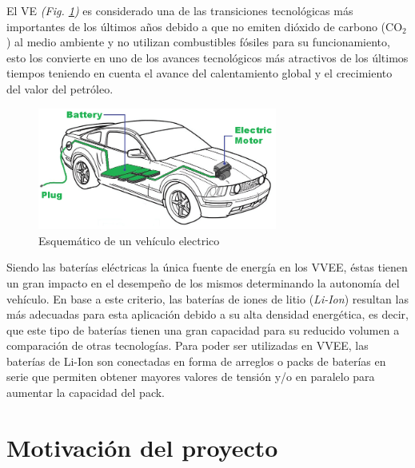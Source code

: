 \documentclass[10pt, a4paper]{report}
\begin{document}
\noindent El \acrfull{VE} \emph{(Fig. \ref{EV})} es considerado 
una de las transiciones tecnológicas más importantes de los últimos años 
debido a que no emiten dióxido de carbono ($\mathrm{CO_2}$) al medio 
ambiente y no utilizan combustibles fósiles para su funcionamiento, esto 
los convierte en uno de los avances tecnológicos más atractivos de los 
últimos tiempos teniendo en cuenta el avance del calentamiento global y el 
crecimiento del valor del petróleo.

\begin{figure}[h!]
    \begin{center}
	\includegraphics[width=0.7\textwidth]{EV.png}
	\caption{Esquem\'atico de un veh\'iculo electrico}
	\label{EV}
    \end{center}
\end{figure}

\noindent Siendo las baterías eléctricas la única fuente de energía en los 
\acrfull{VVEE}, éstas tienen un gran impacto en el desempeño de los mismos 
determinando la autonomía del vehículo. En base a este criterio, las 
baterías de iones de litio (\emph{Li-Ion}) resultan las más adecuadas para 
esta aplicación debido a su alta densidad energética, es decir, que este 
tipo de baterías tienen una gran capacidad para su reducido volumen a 
comparación de otras tecnologías. Para poder ser utilizadas en
\acrshort{VVEE}, las baterías de Li-Ion son conectadas en forma de arreglos 
o packs de baterías en serie que permiten obtener mayores valores de tensión
y/o en paralelo para aumentar la capacidad del pack.

\newpage

\section{Motivaci\'on del proyecto}
\end{document}
